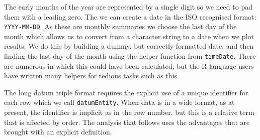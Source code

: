 \documentclass{article}
\newenvironment{Shaded}{\begin{snugshade}}{\end{snugshade}}
\newcommand{\AttributeTok}[1]{\textcolor[rgb]{0.77,0.63,0.00}{#1}}
\newcommand{\CommentTok}[1]{\textcolor[rgb]{0.56,0.35,0.01}{\textit{#1}}}
\newcommand{\DecValTok}[1]{\textcolor[rgb]{0.00,0.00,0.81}{#1}}
\newcommand{\FunctionTok}[1]{\textcolor[rgb]{0.00,0.00,0.00}{#1}}
\newcommand{\NormalTok}[1]{#1}
\newcommand{\OtherTok}[1]{\textcolor[rgb]{0.56,0.35,0.01}{#1}}
\newcommand{\SpecialCharTok}[1]{\textcolor[rgb]{0.00,0.00,0.00}{#1}}
\newcommand{\StringTok}[1]{\textcolor[rgb]{0.31,0.60,0.02}{#1}}
\begin{document}
The early months of the year are represented by a single digit so we need to pad them with a leading zero. The we can create a date in the ISO recognised format: \texttt{YYYY-MM-DD}. As these are monthly summaries we choose the last day of the month which allows us to convert from a character string to a date when we plot results. We do this by building a dummy. but correctly formatted date, and then finding the last day of the month using the helper function from \texttt{timeDate}. There are numerous in which this could have been calculated, but the R language users have written many helpers for tedious tasks such as this.

\begin{Shaded}
\end{Shaded}

The long datum triple format requires the explicit use of a unique identifier for each row which we call \texttt{datumEntity}. When data is in a wide format, as at present, the identifier is implicit as in the row number, but this is a relative term that is affected by order. The analysis that follows uses the advantages that are brought with an explicit definition.
\end{document}
